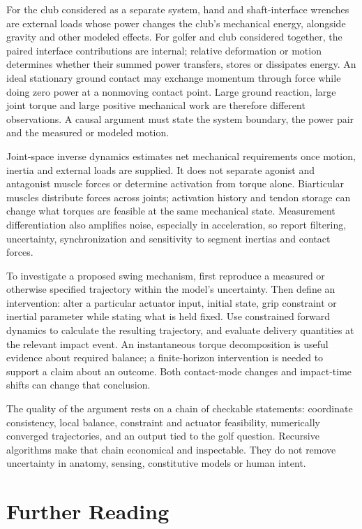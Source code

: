 For the club considered as a separate system, hand and shaft-interface wrenches are external loads whose power changes the club's mechanical energy, alongside gravity and other modeled effects. For golfer and club considered together, the paired interface contributions are internal; relative deformation or motion determines whether their summed power transfers, stores or dissipates energy. An ideal stationary ground contact may exchange momentum through force while doing zero power at a nonmoving contact point. Large ground reaction, large joint torque and large positive mechanical work are therefore different observations. A causal argument must state the system boundary, the power pair and the measured or modeled motion.

Joint-space inverse dynamics estimates net mechanical requirements once motion, inertia and external loads are supplied. It does not separate agonist and antagonist muscle forces or determine activation from torque alone. Biarticular muscles distribute forces across joints; activation history and tendon storage can change what torques are feasible at the same mechanical state. Measurement differentiation also amplifies noise, especially in acceleration, so report filtering, uncertainty, synchronization and sensitivity to segment inertias and contact forces.

To investigate a proposed swing mechanism, first reproduce a measured or otherwise specified trajectory within the model's uncertainty. Then define an intervention: alter a particular actuator input, initial state, grip constraint or inertial parameter while stating what is held fixed. Use constrained forward dynamics to calculate the resulting trajectory, and evaluate delivery quantities at the relevant impact event. An instantaneous torque decomposition is useful evidence about required balance; a finite-horizon intervention is needed to support a claim about an outcome. Both contact-mode changes and impact-time shifts can change that conclusion.

The quality of the argument rests on a chain of checkable statements: coordinate consistency, local balance, constraint and actuator feasibility, numerically converged trajectories, and an output tied to the golf question. Recursive algorithms make that chain economical and inspectable. They do not remove uncertainty in anatomy, sensing, constitutive models or human intent.

\section{Further Reading}
\label{sec:further_reading_ch7}

